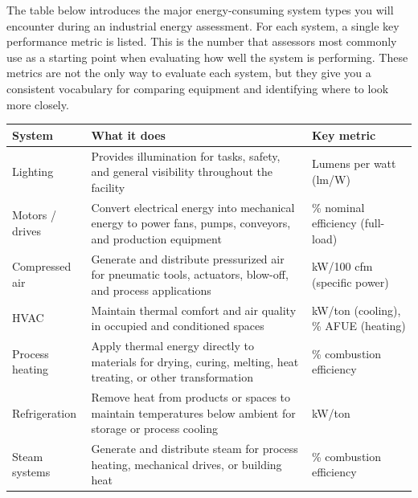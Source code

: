 \documentclass[./main.tex]{subfiles}
\begin{document}
The table below introduces the major energy-consuming system types you will
encounter during an industrial energy assessment. For each system, a single key
performance metric is listed. This is the number that assessors most commonly
use as a starting point when evaluating how well the system is performing.
These metrics are not the only way to evaluate each system, but they give you a
consistent vocabulary for comparing equipment and identifying where to look
more closely.

\begin{longtable}[]{@{}
  >{\raggedright\arraybackslash}p{}
  >{\raggedright\arraybackslash}p{}
  >{\raggedright\arraybackslash}p{}@{}}
\toprule\noalign{}
System & What it does & Key metric \\
\midrule\noalign{}
\endhead
\bottomrule\noalign{}
\endlastfoot
Lighting          & Provides illumination for tasks, safety, and general
                    visibility throughout the facility
                  & Lumens per watt (lm/W) \\
Motors / drives   & Convert electrical energy into mechanical energy to power
                    fans, pumps, conveyors, and production equipment
                  & \% nominal efficiency (full-load) \\
Compressed air    & Generate and distribute pressurized air for pneumatic
                    tools, actuators, blow-off, and process applications
                  & kW/100 cfm (specific power) \\
HVAC              & Maintain thermal comfort and air quality in occupied and
                    conditioned spaces
                  & kW/ton (cooling), \% AFUE (heating) \\
Process heating   & Apply thermal energy directly to materials for drying,
                    curing, melting, heat treating, or other transformation
                  & \% combustion efficiency \\
Refrigeration     & Remove heat from products or spaces to maintain
                    temperatures below ambient for storage or process cooling
                  & kW/ton \\
Steam systems     & Generate and distribute steam for process heating,
                    mechanical drives, or building heat
                  & \% combustion efficiency \\
\end{longtable}
\end{document}
